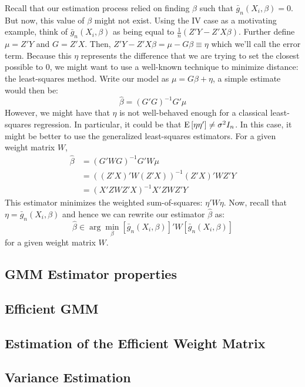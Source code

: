 Recall that our estimation process relied on finding $\beta$ such that $\bar g_n(X_i, \beta) = 0$. But now, this value of $\beta$ might not exist. Using the IV case as a motivating example, think of $\bar g_n(X_i, \beta)$ as being equal to $\frac{1}{n} (Z'Y - Z'X\beta)$. Further define $\mu = Z'Y$ and $G = Z'X$. Then, $Z'Y - Z'X\beta = \mu - G\beta \equiv \eta$ which we'll call the error term. Because this $\eta$ represents the difference that we are trying to set the closest possible to 0, we might want to use a well-known technique to minimize distance: the least-squares method. Write our model as $\mu = G\beta + \eta$, a simple estimate would then be: $$\hat\beta = (G'G)^{-1}G'\mu $$ However, we might have that $\eta$ is not well-behaved enough for a classical least-squares regression. In particular, it could be that $\operatorname{E}\left[\eta\eta'\right]\neq \sigma^2 I_n$. In this case, it might be better to use the generalized least-squares estimators. For a given weight matrix $W$, \begin{align*}\hat\beta & = (G' W G)^{-1}G' W\mu \\ & = ((Z'X)' W (Z'X))^{-1}(Z'X)' W Z'Y \\ & = (X'Z W Z'X)^{-1} X'Z W Z'Y
\end{align*}
This estimator minimizes the weighted sum-of-squares: $\eta' W\eta$. Now, recall that $\eta = \bar g_n(X_i, \beta)$ and hence we can rewrite our estimator $\hat\beta$ as: $$\hat \beta\in \arg\min_{\beta} [\bar g_n(X_i, \beta)]'W[\bar g_n(X_i, \beta)] $$ for a given weight matrix $W$.

\subsection{GMM Estimator properties}



\subsection{Efficient GMM}



\subsection{Estimation of the Efficient Weight Matrix}



\subsection{Variance Estimation}






